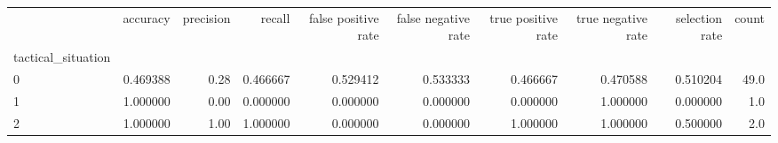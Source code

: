 \begin{tabular}{lrrrrrrrrr}
\toprule
{} &  accuracy &  precision &    recall &  false positive rate &  false negative rate &  true positive rate &  true negative rate &  selection rate &  count \\
tactical\_situation &           &            &           &                      &                      &                     &                     &                 &        \\
\midrule
0                  &  0.469388 &       0.28 &  0.466667 &             0.529412 &             0.533333 &            0.466667 &            0.470588 &        0.510204 &   49.0 \\
1                  &  1.000000 &       0.00 &  0.000000 &             0.000000 &             0.000000 &            0.000000 &            1.000000 &        0.000000 &    1.0 \\
2                  &  1.000000 &       1.00 &  1.000000 &             0.000000 &             0.000000 &            1.000000 &            1.000000 &        0.500000 &    2.0 \\
\bottomrule
\end{tabular}
